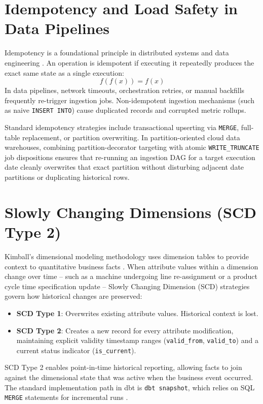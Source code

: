 \documentclass[12pt, a4paper]{report}
\begin{document}
\section{Idempotency and Load Safety in Data Pipelines}
Idempotency is a foundational principle in distributed systems and data engineering \cite{kleppmann_ddia}. An operation is idempotent if executing it repeatedly produces the exact same state as a single execution:
\begin{equation}
    f(f(x)) = f(x)
\end{equation}
In data pipelines, network timeouts, orchestration retries, or manual backfills frequently re-trigger ingestion jobs. Non-idempotent ingestion mechanisms (such as naive \texttt{INSERT INTO}) cause duplicated records and corrupted metric rollups.

Standard idempotency strategies include transactional upserting via \texttt{MERGE}, full-table replacement, or partition overwriting. In partition-oriented cloud data warehouses, combining partition-decorator targeting with atomic \texttt{WRITE\_TRUNCATE} job dispositions ensures that re-running an ingestion DAG for a target execution date cleanly overwrites that exact partition without disturbing adjacent date partitions or duplicating historical rows.

\section{Slowly Changing Dimensions (SCD Type 2)}
Kimball's dimensional modeling methodology uses dimension tables to provide context to quantitative business facts \cite{kimball_dwtoolkit}. When attribute values within a dimension change over time -- such as a machine undergoing line re-assignment or a product cycle time specification update -- Slowly Changing Dimension (SCD) strategies govern how historical changes are preserved:
\begin{itemize}
    \item \textbf{SCD Type 1}: Overwrites existing attribute values. Historical context is lost.
    \item \textbf{SCD Type 2}: Creates a new record for every attribute modification, maintaining explicit validity timestamp ranges (\texttt{valid\_from}, \texttt{valid\_to}) and a current status indicator (\texttt{is\_current}).
\end{itemize}
SCD Type 2 enables point-in-time historical reporting, allowing facts to join against the dimensional state that was active when the business event occurred. The standard implementation path in dbt is \texttt{dbt snapshot}, which relies on SQL \texttt{MERGE} statements for incremental runs \cite{dbt_snapshots_docs}.
\end{document}
